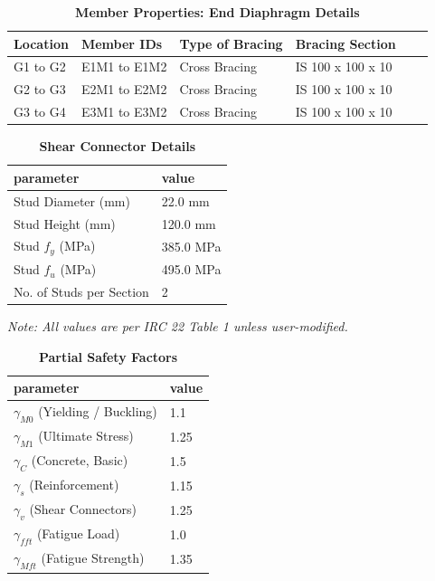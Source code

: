 \documentclass[12pt,a4paper]{report}
\numberwithin{table}{chapter}
\numberwithin{figure}{chapter}
\begin{document}
\begin{longtable}{|L{2.2cm}|L{2.2cm}|L{3.0cm}|L{2.5cm}|C{1.8cm}|C{1.8cm}|}
\caption{\textbf{Member Properties: End Diaphragm Details}}
\hline
\textbf{Location} & \textbf{Member IDs} & \textbf{Type of Bracing} & \textbf{Bracing Section} \\
\hline
G1 to G2 & E1M1 to E1M2 & Cross Bracing & IS 100 x 100 x 10 \\[6pt]
\hline
G2 to G3 & E2M1 to E2M2 & Cross Bracing & IS 100 x 100 x 10 \\[6pt]
\hline
G3 to G4 & E3M1 to E3M2 & Cross Bracing & IS 100 x 100 x 10 \\[6pt]
\hline
\end{longtable}



\label{subsec:shear-connectors}

\vspace{2.2em}

\vspace{0.4em}
\begin{longtable}{|L{5.5cm}|p{10.0cm}|}
\caption{\textbf{Shear Connector Details}}
\hline
\textbf{parameter} & \textbf{value} \\
\hline
\textnormal{Stud Diameter (mm)} & 22.0 mm \\[6pt]
\hline
\textnormal{Stud Height (mm)} & 120.0 mm \\[6pt]
\hline
\textnormal{Stud $f_y$ (MPa)} & 385.0 MPa \\[6pt]
\hline
\textnormal{Stud $f_u$ (MPa)} & 495.0 MPa \\[6pt]
\hline
\textnormal{No. of Studs per Section} & 2 \\[6pt]
\hline
\end{longtable}



\label{subsec:safety-factors}

\vspace{2.2em}

\vspace{0.3em}
\noindent\textit{Note: All values are per IRC 22 Table 1 unless user-modified.}

\vspace{0.4em}
\begin{longtable}{|L{5.5cm}|p{10.0cm}|}
\caption{\textbf{Partial Safety Factors}}
\hline
\textbf{parameter} & \textbf{value} \\
\hline
\textnormal{$\gamma_{M0}$ (Yielding / Buckling)} & 1.1 \\[6pt]
\hline
\textnormal{$\gamma_{M1}$ (Ultimate Stress)} & 1.25 \\[6pt]
\hline
\textnormal{$\gamma_C$ (Concrete, Basic)} & 1.5 \\[6pt]
\hline
\textnormal{$\gamma_s$ (Reinforcement)} & 1.15 \\[6pt]
\hline
\textnormal{$\gamma_v$ (Shear Connectors)} & 1.25 \\[6pt]
\hline
\textnormal{$\gamma_{fft}$ (Fatigue Load)} & 1.0 \\[6pt]
\hline
\textnormal{$\gamma_{Mft}$ (Fatigue Strength)} & 1.35 \\[6pt]
\hline
\end{longtable}
\end{document}
